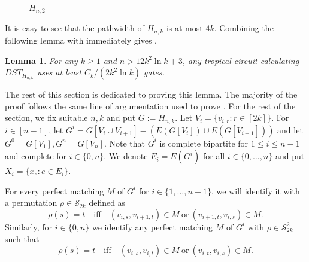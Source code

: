 \documentclass[11pt,a4paper]{article}
\newtheorem{lemma}{Lemma}[section]
\newcommand{\sym}{\mathcal{S}}
\begin{document}
\begin{figure}[h]

    \caption{$H_{n,2}$}
\end{figure}

It is easy to see that the pathwidth of $H_{n, k}$ is at most $4k$. Combining the following lemma with  immediately gives .

\begin{lemma}\label{lem:tc_dst}
    For any $k \geq 1$ and $n > 12k^2 \ln k + 3$, any tropical circuit calculating $DST_{H_{n, k}}$ uses at least
    $C_k / (2k^2 \ln k)$
    gates.
\end{lemma}

The rest of this section is dedicated to proving this lemma. The majority of the proof follows the same line of argumentation used to prove .
For the rest of the section, we fix suitable $n, k$ and put $G := H_{n, k}$. Let $V_i = \{v_{i, r} : r \in [2k]\}$. For $i \in [n - 1]$, let $G^i = G[V_i \cup V_{i + 1}] - (E(G[V_i]) \cup E(G[V_{i+1}]))$ and let $G^0 = G[V_1], G^n = G[V_n]$. Note that $G^i$ is complete bipartite for $1 \leq i \leq n - 1$ and complete for $i \in \{0, n\}$. We denote $E_i = E(G^i)$ for all $i \in \{0, \dots, n\}$ and put $X_i = \{x_e \colon e \in E_i\}$.

For every perfect matching $M$ of $G^i$ for $i \in \{1, \dots, n-1\}$, we will identify it with a permutation $\rho \in \sym_{2k}$ defined as
    $$
        \rho(s) = t \quad \text{iff} \quad (v_{i, s}, v_{i + 1, t}) \in M \ \text{or}\ (v_{i+1, t}, v_{i,s}) \in M.
    $$
    Similarly, for $i \in \{0, n\}$ we identify any perfect matching $M$ of $G^i$ with $\rho \in \sym_{2k}^2$ such that
    $$
        \rho(s) = t \quad \text{iff} \quad (v_{i, s}, v_{i, t}) \in M \ \text{or}\ (v_{i, t}, v_{i, s}) \in M.
    $$
    
\end{document}
